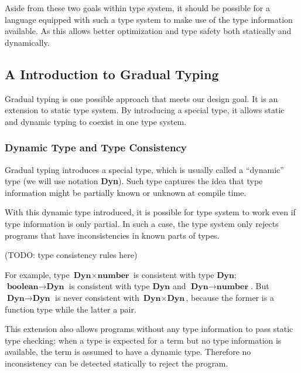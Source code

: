 Aside from these two goals within type system, it should be possible for a language equipped with such a type system to make use of the type information available.
As this allows better optimization and type safety both statically and dynamically.

\subsection{A Introduction to Gradual Typing}

\newcommand{\dyn}{\textbf{Dyn}}

Gradual typing is one possible approach that meets our design goal.
It is an extension to static type system.
By introducing a special type, it allows static and dynamic typing to coexist
in one type system.

\subsubsection{Dynamic Type and Type Consistency}

Gradual typing introduces a special type, which is usually called a ``dynamic'' type
(we will use notation \dyn).
Such type captures the idea that type information might be partially known or
unknown at compile time.

With this dynamic type introduced, it is possible for type system to work
even if type information is only partial. In such a case,
the type system only rejects programs that have inconsistencies in known parts of types.

(TODO: type consistency rules here)

For example, type $\dyn \times \textbf{number}$ is consistent with type $\dyn$;
$\textbf{boolean} \rightarrow \dyn$ is consistent with type $\dyn$ and $\dyn \rightarrow \textbf{number}$. But $\dyn \rightarrow \dyn$ is never consistent with $\dyn \times \dyn$, because the former is a function type while the latter a pair.

This extension also allows programs without any type information to pass static 
type checking: when a type is expected for a term but no type information is available,
the term is assumed to have a dynamic type. Therefore no inconsistency can be detected
statically to reject the program.


